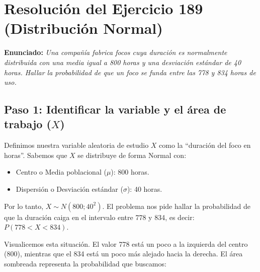 \documentclass[11pt, a4paper]{article}
\begin{document}
\section*{Resolución del Ejercicio 189 (Distribución Normal)}

\textbf{Enunciado:} \textit{Una compañía fabrica focos cuya duración es normalmente distribuida con una media igual a 800 horas y una desviación estándar de 40 horas. Hallar la probabilidad de que un foco se funda entre las 778 y 834 horas de uso.}

\vspace{0.5cm}

\subsection*{Paso 1: Identificar la variable y el área de trabajo ($X$)}
Definimos nuestra variable aleatoria de estudio $X$ como la ``duración del foco en horas''. 
Sabemos que $X$ se distribuye de forma Normal con:
\begin{itemize}
    \item Centro o Media poblacional ($\mu$): 800 horas.
    \item Dispersión o Desviación estándar ($\sigma$): 40 horas.
\end{itemize}
Por lo tanto, $X \sim N(800; 40^2)$. El problema nos pide hallar la probabilidad de que la duración caiga en el intervalo entre 778 y 834, es decir: \textbf{$P(778 < X < 834)$}.

Visualicemos esta situación. El valor 778 está un poco a la izquierda del centro (800), mientras que el 834 está un poco más alejado hacia la derecha. El área sombreada representa la probabilidad que buscamos:

\begin{center}
\end{center}
\end{document}
